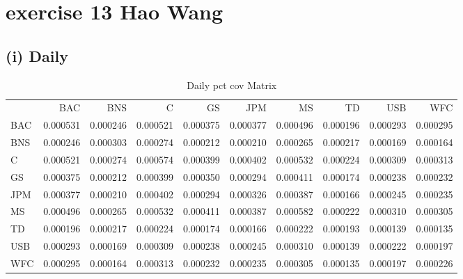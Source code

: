 \documentclass{article}
\begin{document}
\section{exercise 13 Hao Wang}
\subsection*{(i) Daily}
\begin{table}
\caption{Daily pct cov Matrix}
\label{tab:daily_pct_cov}
\begin{tabular}{lrrrrrrrrr}
 & BAC & BNS & C & GS & JPM & MS & TD & USB & WFC \\
BAC & 0.000531 & 0.000246 & 0.000521 & 0.000375 & 0.000377 & 0.000496 & 0.000196 & 0.000293 & 0.000295 \\
BNS & 0.000246 & 0.000303 & 0.000274 & 0.000212 & 0.000210 & 0.000265 & 0.000217 & 0.000169 & 0.000164 \\
C & 0.000521 & 0.000274 & 0.000574 & 0.000399 & 0.000402 & 0.000532 & 0.000224 & 0.000309 & 0.000313 \\
GS & 0.000375 & 0.000212 & 0.000399 & 0.000350 & 0.000294 & 0.000411 & 0.000174 & 0.000238 & 0.000232 \\
JPM & 0.000377 & 0.000210 & 0.000402 & 0.000294 & 0.000326 & 0.000387 & 0.000166 & 0.000245 & 0.000235 \\
MS & 0.000496 & 0.000265 & 0.000532 & 0.000411 & 0.000387 & 0.000582 & 0.000222 & 0.000310 & 0.000305 \\
TD & 0.000196 & 0.000217 & 0.000224 & 0.000174 & 0.000166 & 0.000222 & 0.000193 & 0.000139 & 0.000135 \\
USB & 0.000293 & 0.000169 & 0.000309 & 0.000238 & 0.000245 & 0.000310 & 0.000139 & 0.000222 & 0.000197 \\
WFC & 0.000295 & 0.000164 & 0.000313 & 0.000232 & 0.000235 & 0.000305 & 0.000135 & 0.000197 & 0.000226 \\
\end{tabular}
\end{table}
\end{document}
